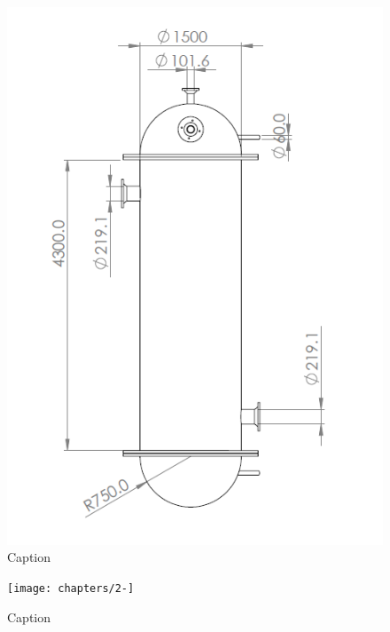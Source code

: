 \begin{figure}
    \centering
    \includegraphics[width=0.49\linewidth]{chapters/2-reaction/figures/FYD reactor right view with calc.PNG}
    \caption{Caption}
    \label{fig:reactorright}
\end{figure}

\begin{figure}
    \centering
    \texttt{[image: chapters/2-]}
    \caption{Caption}
    \label{fig:reactorright}
\end{figure}